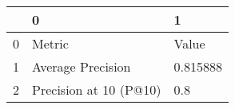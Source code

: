 \begin{tabular}{lll}
\toprule
{} &                       0 &         1 \\
\midrule
0 &                  Metric &     Value \\
1 &       Average Precision &  0.815888 \\
2 &  Precision at 10 (P@10) &       0.8 \\
\bottomrule
\end{tabular}
